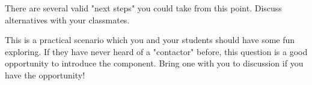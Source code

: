 There are several valid "next steps" you could take from this point.  Discuss alternatives with your classmates.







This is a practical scenario which you and your students should have some fun exploring.  If they have never heard of a "contactor" before, this question is a good opportunity to introduce the component.  Bring one with you to discussion if you have the opportunity!




